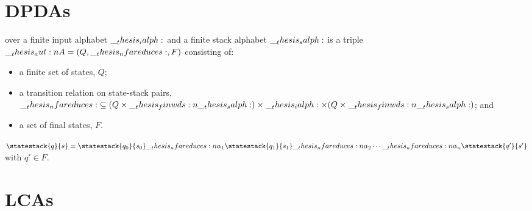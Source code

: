 \section{\Aclp*{DPDA}}

\begin{definition}
   over a finite input alphabet $\__thesis_ialph:$ and a finite stack alphabet $\__thesis_salph:$ is a triple $\aut{A} = (Q, \mathord{\nfareduces}, F)$ consisting of:
  \begin{itemize}
  \item a finite set of states, $Q$;
  \item a transition relation on state-stack pairs, $\mathord{\nfareduces} \subseteq (Q \times \finwds{\salph}) \times \ialph \times (Q \times \finwds{\salph})$; and
  \item a set of final states, $F$.
  \end{itemize}
  $\statestack{q}{s} = \statestack{q_0}{s_0} \nfareduces[\alpha_1] \statestack{q_1}{s_1} \nfareduces[\alpha_2] \dotsb \nfareduces[\alpha_n] \statestack{q'}{s'}$ with $q' \in F$.
\end{definition}


\section{\Aclp*{LCA}}


